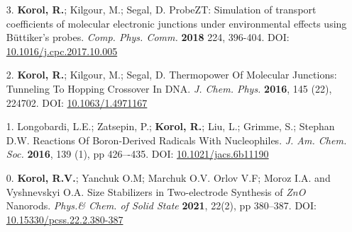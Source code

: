 \documentclass[11pt]{res}
\begin{document}
\begin{resume}
\begin{enumerate}
	\item[3.] \textbf{Korol, R.}; Kilgour,  M.; Segal, D. ProbeZT: Simulation of transport coefficients of molecular electronic junctions under environmental effects using B\"uttiker’s probes. \textit{Comp. Phys. Comm.} \textbf{2018} 224, 396-404. DOI: \href{https://doi.org/10.1016/j.cpc.2017.10.005}{10.1016/j.cpc.2017.10.005}

	\item[2.] \textbf{Korol, R.}; Kilgour,  M.; Segal, D. Thermopower Of Molecular Junctions: Tunneling To Hopping Crossover In DNA. \textit{J. Chem. Phys.} \textbf{2016}, 145 (22), 224702. DOI: \href{http://aip.scitation.org/doi/abs/10.1063/1.4971167}{10.1063/1.4971167}

	\item[1.] Longobardi, L.E.; Zatsepin, P.; \textbf{Korol, R.}; Liu, L.; Grimme, S.; Stephan D.W. Reactions Of Boron-Derived Radicals With Nucleophiles. \textit{J. Am. Chem. Soc.} \textbf{2016}, 139 (1), pp 426–-435. DOI: \href{http://pubs.acs.org/doi/abs/10.1021/jacs.6b11190}{10.1021/jacs.6b11190}

	\item[0.] \textbf{Korol, R.V.}; Yanchuk O.M; Marchuk O.V. Orlov V.F; Moroz I.A. and Vyshnevskyi O.A. Size Stabilizers in Two-electrode Synthesis of {\it ZnO} Nanorods. \textit{Phys.\& Chem. of Solid State} \textbf{2021}, 22(2), pp 380--387. DOI: \href{https://doi.org/10.15330/pcss.22.2.380-387}{10.15330/pcss.22.2.380-387}
\end{enumerate}
 
\end{resume}
\end{document}

